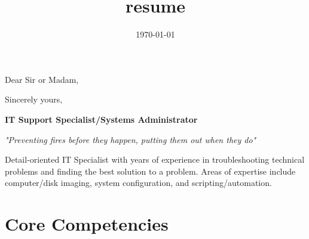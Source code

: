 \documentclass[12pt,letterpaper,sans]{moderncv} %
\title{resume}
\begin{document}


\clearpage

\date{\today} %
\opening{Dear Sir or Madam,} %
\closing{Sincerely yours,} %

\makelettertitle %

\lipsum[2] %
\lipsum[3] %
\lipsum[4]

\makeletterclosing %

\newpage


\makecvtitle %



\begin{center}
	\textbf{IT Support Specialist/Systems Administrator}\\
\end{center}
\begin{center}
	\textit{"Preventing fires before they happen, putting them out when they do"}\\
\end{center}
Detail-oriented IT Specialist with years of experience in troubleshooting technical problems and finding the best solution to a problem. Areas of expertise include computer/disk imaging, system configuration, and scripting/automation.

\section{Core Competencies}
\end{document}
